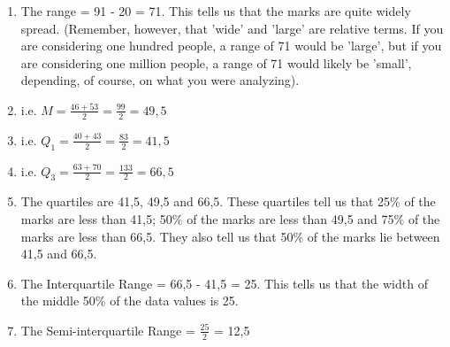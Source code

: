 \begin{description}[noitemsep]
\begin{description}[noitemsep]
{\begin{mdframed}[linewidth=4, leftmargin=40, rightmargin=40]
\begin{exercise}
\begin{enumerate}[noitemsep, label=\textbf{Step} \textbf{\arabic*}. ]
\begin{table}
\end{table}
    \par
          \item  
          \label{m39400*id214357}The range = 91 - 20 = 71. This tells us that the marks are quite widely spread. (Remember, however, that 'wide' and 'large' are relative terms. If you are considering one hundred people, a range of 71 would be 'large', but if you are considering one million people, a range of 71 would likely be 'small', depending, of course, on what you were analyzing).\par 
          \item  
          \label{m39400*id214365}i.e. $M=\frac{46+53}{2}=\frac{99}{2}=49,5$\par 
          \item  
          \label{m39400*id214413}i.e. ${Q}_{1}=\frac{40+43}{2}=\frac{83}{2}=41,5$\par 
          \item  
          \label{m39400*id214466}i.e. ${Q}_{3}=\frac{63+70}{2}=\frac{133}{2}=66,5$\par 
          \item  
          \label{m39400*id214518}The quartiles are 41,5, 49,5 and 66,5. These quartiles tell us that 25$\%$ of the marks are less than 41,5; 50$\%$ of the marks are less than 49,5 and 75$\%$ of the marks are less than 66,5. They also tell us that 50$\%$ of the marks lie between 41,5 and 66,5.\par 
          \item  
          \label{m39400*id214562}The Interquartile Range = 66,5 - 41,5 = 25. This tells us that the width of the middle 50$\%$ of the data values is 25.\par 
          \item  
          \label{m39400*id214579}The Semi-interquartile Range = $\frac{25}{2}$ = 12,5\par 
\end{enumerate}
    \end{exercise}
    \end{mdframed}
    }
    \noindent
        \label{m39400*uid81}

\end{description}
\end{description}
